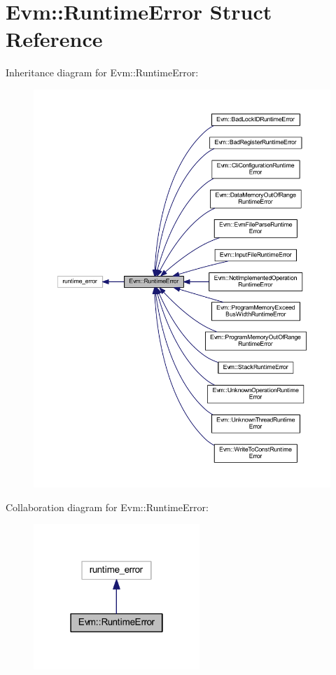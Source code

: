 \hypertarget{struct_evm_1_1_runtime_error}{}\section{Evm\+:\+:Runtime\+Error Struct Reference}
\label{struct_evm_1_1_runtime_error}


Inheritance diagram for Evm\+:\+:Runtime\+Error\+:
\nopagebreak
\begin{figure}[H]
\begin{center}
\leavevmode
\includegraphics[width=350pt]{struct_evm_1_1_runtime_error__inherit__graph}
\end{center}
\end{figure}


Collaboration diagram for Evm\+:\+:Runtime\+Error\+:
\nopagebreak
\begin{figure}[H]
\begin{center}
\leavevmode
\includegraphics[width=178pt]{struct_evm_1_1_runtime_error__coll__graph}
\end{center}
\end{figure}
